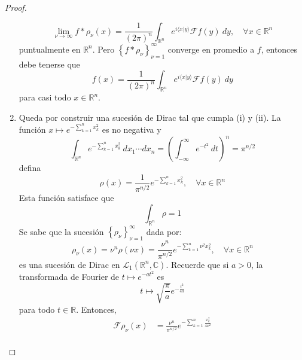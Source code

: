 \documentclass[12pt]{report}
\theoremstyle{largebreak}
\newcommand\pint[2]{\ensuremath{\langle#1| #2\rangle}}
\newcommand{\fou}[1]{\ensuremath{\mathcal{F}#1}}
\begin{document}
\begin{proof}
\begin{enumerate}
\begin{equation*}
                \lim_{ \nu\rightarrow\infty}f*\rho_\nu(x)=\frac{1}{(2\pi)^n}\int_{\mathbb{R}^n}e^{ i\pint{x}{y}}\fou{f}(y)\:dy,\quad\forall x\in\mathbb{R}^n
            \end{equation*}
            puntualmente en $\mathbb{R}^n$. Pero $\left\{f*\rho_\nu \right\}_{\nu=1}^\infty$ converge en promedio a $f$, entonces debe tenerse que
            \begin{equation*}
                f(x)=\frac{1}{(2\pi)^n}\int_{\mathbb{R}^n}e^{ i\pint{x}{y}}\fou{f}(y)\:dy
            \end{equation*}
            para casi todo $x\in\mathbb{R}^n$.
            \item Queda por construir una sucesión de Dirac tal que cumpla (i) y (ii). La función $x\mapsto e^{-\sum_{ k=1}^n x_k^2}$ es no negativa y
            \begin{equation*}
                \int_{\mathbb{R}^n}e^{ -\sum_{ k=1}^n x_k^2}\:dx_1\cdots dx_n=\left(\int_{-\infty}^\infty e^{ -t^2}\:dt\right)^n=\pi^{ n/2}
            \end{equation*}
            defina
            \begin{equation*}
                \rho(x)=\frac{1}{\pi^{ n/2}}e^{-\sum_{ k=1}^n x_k^2},\quad\forall x\in\mathbb{R}^n
            \end{equation*}
            Esta función satisface que
            \begin{equation*}
                \int_{\mathbb{R}^n}\rho=1
            \end{equation*}
            Se sabe que la sucesión $\left\{\rho_\nu\right\}_{\nu=1}^\infty$ dada por:
            \begin{equation*}
                \rho_\nu(x)=\nu^n \rho(\nu x)=\frac{\nu^n}{\pi^{ n/2}}e^{-\sum_{ k=1}^n \nu^2 x_k^2},\quad\forall x\in\mathbb{R}^n
            \end{equation*}
            es una sucesión de Dirac en $\mathcal{L}_1(\mathbb{R}^n,\mathbb{C})$. Recuerde que si $a>0$, la transformada de Fourier de $t\mapsto e^{ -at^2}$ es
            \begin{equation*}
                t\mapsto\sqrt{\frac{\pi}{a}}e^{-\frac{t^2}{4a}}
            \end{equation*}
            para todo $t\in\mathbb{R}$. Entonces,
            \begin{equation*}
                \begin{split}
                    \fou{\rho_\nu}(x)&=\frac{\nu^n}{\pi^{ n/2}}e^{ -\sum_{ k=1}^n \frac{x_k^2}{4\nu^2}}\\

\end{split}
\end{equation*}
\end{enumerate}
\end{proof}
\end{document}
